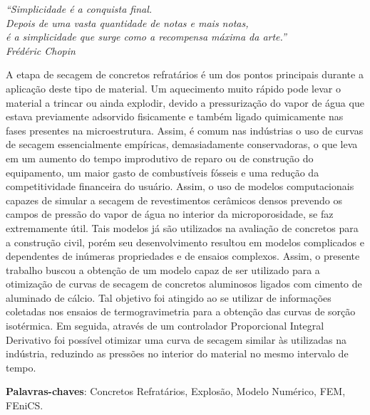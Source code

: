 \documentclass[
	12pt,				%
	openright,			%
	twoside,			%
	a4paper,			%
	chapter=TITLE,		%
	english,			%
	french,				%
	spanish,			%
	brazil,				%
	hyphens,
  oldfontcommands]{abntex2}
\theoremstyle{definition}
\theoremstyle{definition}
\begin{document}
\begin{epigrafe}
    \vspace*{\fill}
	\begin{flushright}
		\textit{``Simplicidade é a conquista final.\\ Depois de uma vasta quantidade
      de notas e mais notas, \\ é a simplicidade que surge como a recompensa
      máxima da arte.''\\
		Frédéric Chopin}
	\end{flushright}
\end{epigrafe}


\begin{resumo}


 \vspace{\onelineskip}
    
 \noindent
 A etapa de secagem de concretos refratários é um dos pontos principais durante
 a aplicação deste tipo de material. Um aquecimento muito rápido pode levar o
 material a trincar ou ainda explodir, devido a pressurização do vapor de água
 que estava previamente adsorvido fisicamente e também ligado quimicamente nas
 fases presentes na microestrutura. Assim, é comum nas indústrias o uso de
 curvas de secagem essencialmente empíricas, demasiadamente conservadoras, o que
 leva em um aumento do tempo improdutivo de reparo ou de construção do
 equipamento, um maior gasto de combustíveis fósseis e uma redução da
 competitividade financeira do usuário. Assim, o uso de modelos computacionais
 capazes de simular a secagem de revestimentos cerâmicos densos prevendo os
 campos de pressão do vapor de água no interior da microporosidade, se faz
 extremamente útil. Tais modelos já são utilizados na avaliação de concretos
 para a construção civil, porém seu desenvolvimento resultou em modelos
 complicados e dependentes de inúmeras propriedades e de ensaios complexos.
 Assim, o presente trabalho buscou a obtenção de um modelo capaz de ser
 utilizado para a otimização de curvas de secagem de concretos aluminosos
 ligados com cimento de aluminado de cálcio. Tal objetivo foi atingido ao se
 utilizar de informações coletadas nos ensaios de termogravimetria para a
 obtenção das curvas de sorção isotérmica. Em seguida, através de um controlador
 Proporcional Integral Derivativo foi possível otimizar uma curva de secagem
 similar às utilizadas na indústria, reduzindo as pressões no interior do
 material no mesmo intervalo de tempo.
 
 \textbf{Palavras-chaves}: Concretos Refratários, Explosão, Modelo Numérico, FEM, FEniCS.
\end{resumo}
\end{document}
